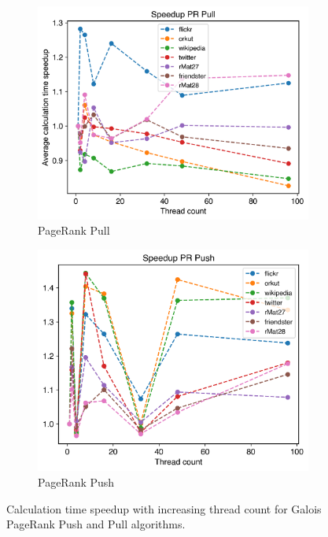 \begin{figure}
	\begin{subfigure}{\columnwidth}
		\includegraphics[width=\columnwidth]{../../plots/singleNodePRPullGaloisThreads.png}
		\caption{PageRank Pull}
		\label{fig:singleNodePRPullGaloisThreads}
	\end{subfigure}
	\begin{subfigure}{\columnwidth}
		\includegraphics[width=\columnwidth]{../../plots/singleNodePRPushGaloisThreads.png}
		\caption{PageRank Push}
		\label{fig:singleNodePRPushGaloisThreads}
	\end{subfigure}
	\caption{Calculation time speedup with increasing thread count for Galois PageRank Push and Pull algorithms.}
\end{figure}





